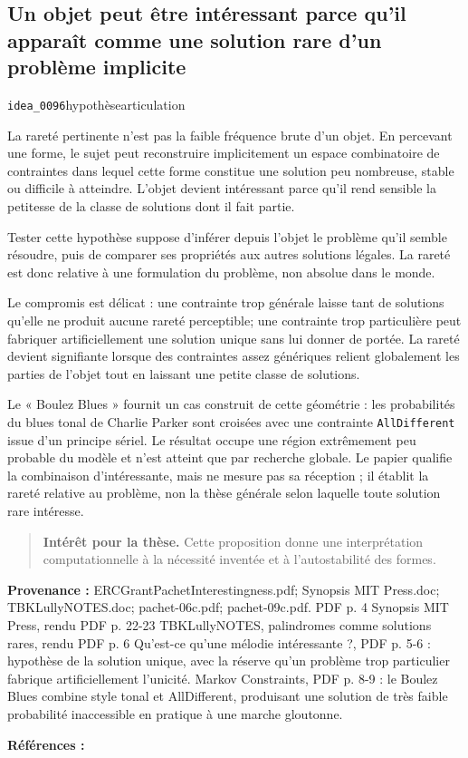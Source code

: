 \documentclass[10pt,a4paper]{article}
\begin{document}
\subsection{Un objet peut être intéressant parce qu'il apparaît comme une solution rare d'un problème implicite}
{\small\color{metadata} \texttt{idea\_0096}\quad\textbullet\quad hypothèse\quad\textbullet\quad articulation\par}

La rareté pertinente n'est pas la faible fréquence brute d'un objet. En percevant une forme, le sujet peut reconstruire implicitement un espace combinatoire de contraintes dans lequel cette forme constitue une solution peu nombreuse, stable ou difficile à atteindre. L'objet devient intéressant parce qu'il rend sensible la petitesse de la classe de solutions dont il fait partie.

Tester cette hypothèse suppose d'inférer depuis l'objet le problème qu'il semble résoudre, puis de comparer ses propriétés aux autres solutions légales. La rareté est donc relative à une formulation du problème, non absolue dans le monde.

Le compromis est délicat : une contrainte trop générale laisse tant de solutions qu'elle ne produit aucune rareté perceptible; une contrainte trop particulière peut fabriquer artificiellement une solution unique sans lui donner de portée. La rareté devient signifiante lorsque des contraintes assez génériques relient globalement les parties de l'objet tout en laissant une petite classe de solutions.

Le « Boulez Blues » fournit un cas construit de cette géométrie : les probabilités du blues tonal de Charlie Parker sont croisées avec une contrainte \texttt{AllDifferent} issue d'un principe sériel. Le résultat occupe une région extrêmement peu probable du modèle et n'est atteint que par recherche globale. Le papier qualifie la combinaison d'intéressante, mais ne mesure pas sa réception ; il établit la rareté relative au problème, non la thèse générale selon laquelle toute solution rare intéresse.

\begin{quote}
\textbf{Intérêt pour la thèse.} Cette proposition donne une interprétation computationnelle à la nécessité inventée et à l'autostabilité des formes.
\end{quote}
{\footnotesize\color{metadata}\textbf{Provenance :} ERCGrantPachetInterestingness.pdf; Synopsis MIT Press.doc; TBKLullyNOTES.doc; pachet-06c.pdf; pachet-09c.pdf. PDF p. 4 Synopsis MIT Press, rendu PDF p. 22-23 TBKLullyNOTES, palindromes comme solutions rares, rendu PDF p. 6 Qu'est-ce qu'une mélodie intéressante ?, PDF p. 5-6 : hypothèse de la solution unique, avec la réserve qu'un problème trop particulier fabrique artificiellement l'unicité. Markov Constraints, PDF p. 8-9 : le Boulez Blues combine style tonal et AllDifferent, produisant une solution de très faible probabilité inaccessible en pratique à une marche gloutonne.\par}
{\footnotesize\color{metadata}\textbf{Références :} \parencite{pachet2000melodie,pachet2011markov}\par}
\end{document}
